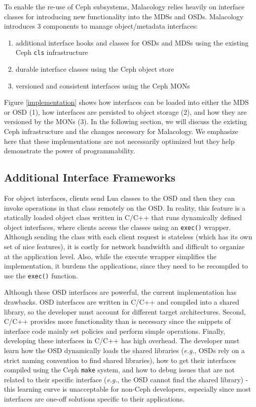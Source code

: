 \documentclass[10pt,twocolumn]{article}
\begin{document}
To enable the re-use of Ceph subsystems, Malacology relies heavily on
interface classes for introducing new functionality into the MDSs and
OSDs. Malacology introduces 3 components to manage object/metadata
interfaces:

\begin{enumerate}
\def\labelenumi{\arabic{enumi}.}
\item
  additional interface hooks and classes for OSDs and MDSs using the
  existing Ceph \texttt{cls} infrastructure
\item
  durable interface classes using the Ceph object store
\item
  versioned and consistent interfaces using the Ceph MONs
\end{enumerate}

Figure \ref{implementation} shows how interfaces can be loaded into
either the MDS or OSD (1), how interfaces are persisted to object
storage (2), and how they are versioned by the MONs (3). In the
following section, we will discuss the existing Ceph infrastructure and
the changes necessary for Malacology. We emphasize here that these
implementations are not necessarily optimized but they help demonstrate
the power of programmability.

\subsection{Additional Interface
Frameworks}\label{additional-interface-frameworks}

For object interfaces, clients send Lua classes to the OSD and then they
can invoke operations in that class remotely on the OSD. In reality,
this feature is a statically loaded object class written in C/C++ that
runs dynamically defined object interfaces, where clients access the
classes using an \texttt{exec()} wrapper. Although sending the class
with each client request is stateless (which has its own set of nice
features), it is costly for network bandwidth and difficult to organize
at the application level. Also, while the execute wrapper simplifies the
implementation, it burdens the applications, since they need to be
recompiled to use the \texttt{exec()} function.

Although these OSD interfaces are powerful, the current implementation
has drawbacks. OSD interfaces are written in C/C++ and compiled into a
shared library, so the developer must account for different target
architectures. Second, C/C++ provides more functionality than is
necessary since the snippets of interface code mainly set policies and
perform simple operations. Finally, developing these interfaces in C/C++
has high overhead. The developer must learn how the OSD dynamically
loads the shared libraries (\emph{e.g.}, OSDs rely on a strict naming
convention to find shared libraries), how to get their interfaces
compiled using the Ceph \texttt{make} system, and how to debug issues
that are not related to their specific interface (\emph{e.g.}, the OSD
cannot find the shared library) - this learning curve is unacceptable
for non-Ceph developers, especially since most interfaces are one-off
solutions specific to their applications.
\end{document}
